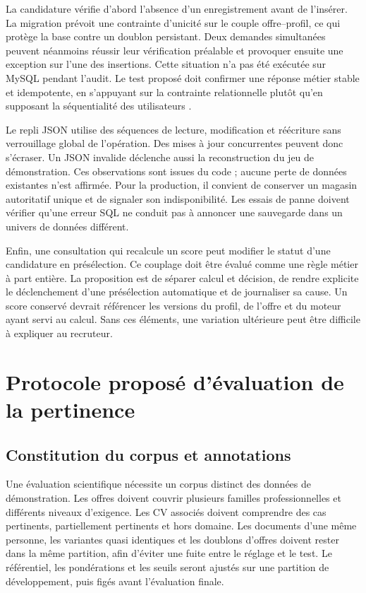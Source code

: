 La candidature vérifie d'abord l'absence d'un enregistrement avant de l'insérer. La migration prévoit une contrainte d'unicité sur le couple offre--profil, ce qui protège la base contre un doublon persistant. Deux demandes simultanées peuvent néanmoins réussir leur vérification préalable et provoquer ensuite une exception sur l'une des insertions. Cette situation n'a pas été exécutée sur MySQL pendant l'audit. Le test proposé doit confirmer une réponse métier stable et idempotente, en s'appuyant sur la contrainte relationnelle plutôt qu'en supposant la séquentialité des utilisateurs \cite{mysql-constraints}.

Le repli JSON utilise des séquences de lecture, modification et réécriture sans verrouillage global de l'opération. Des mises à jour concurrentes peuvent donc s'écraser. Un JSON invalide déclenche aussi la reconstruction du jeu de démonstration. Ces observations sont issues du code ; aucune perte de données existantes n'est affirmée. Pour la production, il convient de conserver un magasin autoritatif unique et de signaler son indisponibilité. Les essais de panne doivent vérifier qu'une erreur SQL ne conduit pas à annoncer une sauvegarde dans un univers de données différent.

Enfin, une consultation qui recalcule un score peut modifier le statut d'une candidature en présélection. Ce couplage doit être évalué comme une règle métier à part entière. La proposition est de séparer calcul et décision, de rendre explicite le déclenchement d'une présélection automatique et de journaliser sa cause. Un score conservé devrait référencer les versions du profil, de l'offre et du moteur ayant servi au calcul. Sans ces éléments, une variation ultérieure peut être difficile à expliquer au recruteur.

\section{Protocole proposé d'évaluation de la pertinence}

\subsection{Constitution du corpus et annotations}

Une évaluation scientifique nécessite un corpus distinct des données de démonstration. Les offres doivent couvrir plusieurs familles professionnelles et différents niveaux d'exigence. Les CV associés doivent comprendre des cas pertinents, partiellement pertinents et hors domaine. Les documents d'une même personne, les variantes quasi identiques et les doublons d'offres doivent rester dans la même partition, afin d'éviter une fuite entre le réglage et le test. Le référentiel, les pondérations et les seuils seront ajustés sur une partition de développement, puis figés avant l'évaluation finale.

